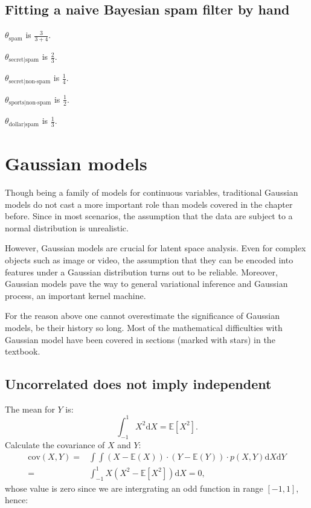 \documentclass[UTF8]{ctexart}
\begin{document}
\subsection{Fitting a naive Bayesian spam filter by hand}
$\theta_{\text{spam}}$ is $\frac{3}{3+4}$.

$\theta_{\text{secret}|\text{spam}}$ is $\frac{2}{3}$.

$\theta_{\text{secret}|\text{non-spam}}$ is $\frac{1}{4}$.

$\theta_{\text{sports}|\text{non-spam}}$ is $\frac{1}{2}$.

$\theta_{\text{dollar}|\text{spam}}$ is $\frac{1}{3}$.

\newpage
\section{Gaussian models}
Though being a family of models for continuous variables, traditional Gaussian models do not cast a more important role than models covered in the chapter before.
Since in most scenarios, the assumption that the data are subject to a normal distribution is unrealistic.

However, Gaussian models are crucial for latent space analysis.
Even for complex objects such as image or video, the assumption that they can be encoded into features under a Gaussian distribution turns out to be reliable.
Moreover, Gaussian models pave the way to general variational inference and Gaussian process, an important kernel machine.

For the reason above one cannot overestimate the significance of Gaussian models, be their history so long.
Most of the mathematical difficulties with Gaussian model have been covered in sections (marked with stars) in the textbook.

\subsection{Uncorrelated does not imply independent}
The mean for $Y$ is:
$$\int_{-1}^{1}X^{2}\text{d}X=\mathbb{E}[X^{2}].$$
Calculate the covariance of $X$ and $Y$:
\begin{align}
\text{cov}(X,Y)=&\int\int (X-\mathbb{E}(X))\cdot (Y-\mathbb{E}(Y))\cdot p(X,Y)\text{d}X\text{d}Y \nonumber \\
=&\int_{-1}^{1}X(X^{2}-\mathbb{E}[X^{2}])\text{d}X=0, \nonumber
\end{align}
whose value is zero since we are intergrating an odd function in range $[-1,1]$, hence:
\end{document}

